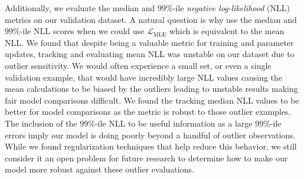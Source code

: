 Additionally, we evaluate the median and $99\%$-ile \textit{negative log-likelihood} (NLL) metrics on
our validation dataset.
A natural question is why use the median and $99\%$-ile NLL scores when we could use $\mathcal{L}_{\text{MLE}}$
which is equivalent to the mean NLL\@.
We found that despite being a valuable metric for training and parameter updates, tracking and evaluating mean NLL was
unstable on our dataset due to outlier sensitivity.
We would often experience a small set, or even a single validation example, that would have incredibly large NLL
values causing the mean calculations to be biased by the outliers leading to unstable results making fair model comparisons
difficult.
We found the tracking median NLL values to be better for model comparisons as the metric is robust to those outlier examples.
The inclusion of the $99\%$-ile NLL to be useful information as a large $99\%$-ile errors imply
our model is doing poorly beyond a handful of outlier observations.
While we found regularization techniques that help reduce this behavior, we still consider it an open problem for future
research to determine how to make our model more robust against these outlier evaluations.
